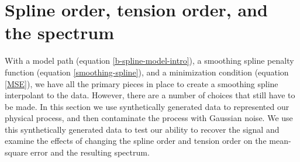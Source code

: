 \documentclass[10pt,journal]{IEEEtran}
\begin{document}


%
\section{Spline order, tension order, and the spectrum} \label{sec:spline_order_tension_order_spectrum}
%

With a model path (equation \ref{b-spline-model-intro}), a smoothing spline penalty function (equation \ref{smoothing-spline}), and a minimization condition (equation \ref{MSE}), we have all the primary pieces in place to create a smoothing spline interpolant to the data. However, there are a number of choices that still have to be made. In this section we use synthetically generated data to represented our physical process, and then contaminate the process with Gaussian noise. We use this synthetically generated data to test our ability to recover the signal and examine the effects of changing the spline order and tension order on the mean-square error and the resulting spectrum.
\end{document}
